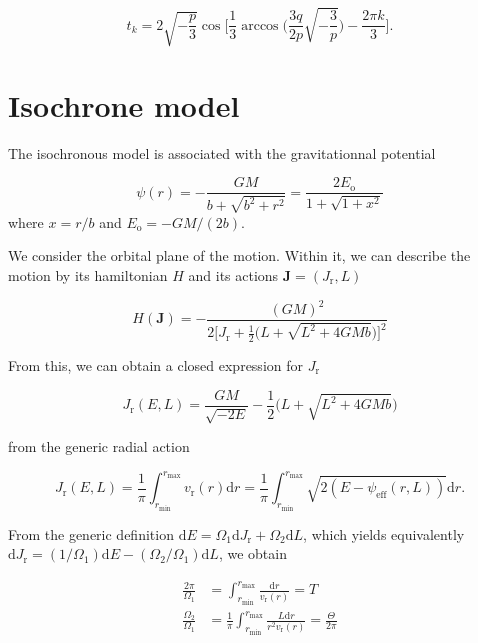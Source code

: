 \documentclass[11pt]{article}
\newcommand{\rr}{\mathrm{r}}
\newcommand{\ro}{\mathrm{o}}
\newcommand{\Eo}{E_{\ro}}
\newcommand{\vr}{v_{\rr}}
\newcommand{\rd}{{\mathrm{d}}}
\newcommand{\rmax}{r_{\max}}
\newcommand{\rmin}{r_{\min}}
\newcommand{\psieff}{\psi_{\mathrm{eff}}}
\newcommand{\Jr}{J_{\mathrm{r}}}
\newcommand{\bJ}{\boldsymbol{J}}
\begin{document}
\begin{equation}
  t_{k} = 2\sqrt{-\frac{p}{3}} \cos\bigg[\frac{1}{3}\arccos\bigg(\frac{3q}{2p} \sqrt{-\frac{3}{p}}\bigg)-\frac{2\pi k}{3}\bigg] .
  \label{eq:Viete_formula_bounds_Plummer}
\end{equation}


\section{Isochrone model}
\label{sec:Isochrone}

The isochronous model is associated with the gravitationnal potential

\begin{equation}
  \psi(r) = - \frac{GM}{b+\sqrt{b^{2}+r^{2}}} = \frac{2 \Eo}{1+\sqrt{1+x^{2}}}
  \label{eq:IsoPotential}
\end{equation}
where $x=r/b$ and $\Eo=-GM/(2b)$.

We consider the orbital plane of the motion. Within it, we can describe the motion by its hamiltonian $H$ and its actions $\bJ = (\Jr,L)$

\begin{equation}
  H(\bJ) = - \frac{(GM)^{2}}{2 \bigg[\Jr + \frac{1}{2} \bigg(L+\sqrt{L^{2}+4GMb}\bigg)\bigg]^{2}}
  \label{eq:HamiltionianIso}
\end{equation}

From this, we can obtain a closed expression for $\Jr$

\begin{equation}
  \Jr (E,L)= \frac{GM}{\sqrt{-2E}} - \frac{1}{2} \bigg(L+\sqrt{L^{2}+4GMb}\bigg)
  \label{eq:Jr_Iso}
\end{equation}

from the generic radial action

\begin{equation}
  \Jr (E,L)= \frac{1}{\pi} \int_{\rmin}^{\rmax} \vr(r) \rd r =  \frac{1}{\pi} \int_{\rmin}^{\rmax} \sqrt{2(E-\psieff(r,L))} \rd r .
  \label{eq:Jr_Generic}
\end{equation}

From the generic definition $\rd E = \Omega_{1} \rd \Jr + \Omega_{2} \rd L$, which yields equivalently $\rd \Jr = (1/\Omega_{1}) \rd E - (\Omega_{2}/\Omega_{1}) \rd L$, we obtain

\begin{align*}
  \frac{2\pi}{\Omega_{1}} &= \int_{\rmin}^{\rmax} \frac{\rd r}{\vr(r)} = T \\
  \frac{\Omega_{2}}{\Omega_{1}} &= \frac{1}{\pi} \int_{\rmin}^{\rmax} \frac{L \rd r}{r^{2} \vr(r)} = \frac{\Theta}{2\pi}
\end{align*}
\end{document}
